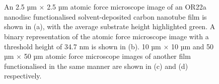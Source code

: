 \documentclass[
  a4paper,
]{scrbook}
\begin{document}
\begin{figure}
\begin{minipage}[t]{0.03\linewidth}
{

}

\end{minipage}%
%
\begin{minipage}[t]{0.01\linewidth}

{\centering 

~

}

\end{minipage}%
%
\begin{minipage}[t]{0.45\linewidth}

{\centering 


}

\end{minipage}%
%
\begin{minipage}[t]{0.01\linewidth}

{\centering 

~

}

\end{minipage}%

\caption{\label{fig-solvent-deposited-AFM-comparison}An 2.5 µm
\(\times\) 2.5 µm atomic force microscope image of an OR22a nanodisc
functionalised solvent-deposited carbon nanotube film is shown in (a),
with the average substrate height highlighted green. A binary
representation of the atomic force microscope image with a threshold
height of 34.7 nm is shown in (b). 10 µm \(\times\) 10 µm and 50 µm
\(\times\) 50 µm atomic force microscope images of another film
functionalised in the same manner are shown in (c) and (d)
respectively.}

\end{figure}
\end{document}
